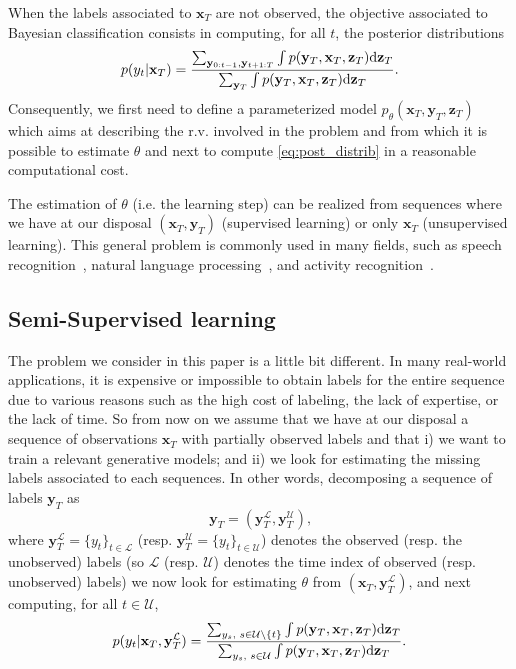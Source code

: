 \documentclass{article}
\def\x{{\mathbf x}}
\def\z{{\mathbf z}}
\def\y{{\mathbf y}}
\def\yl{{\mathbf y}_{T}^{\mathcal{L}}}
\def\yu{{\mathbf y}_{T}^{\mathcal{U}}}
\def\L{{\mathcal L}}
\def\p{p_{\theta}}
\def\L{\mathcal{L}}
\def\U{\mathcal{U}}
\begin{document}
When the labels associated to $\x_T$
are not observed, the objective associated to Bayesian classification consists in computing, for all $t$, the posterior distributions 
\begin{equation}
\label{eq:post_distrib}
p(y_t|\x_T)= %
\frac{\sum_{\y_{0:t-1},\y_{t+1:T}} \int p(\y_T,\x_T,\z_T) {\rm d}\z_T  } {\sum_{\y_T} \int p(\y_T,\x_T,\z_T) {\rm d}\z_T} \text{.}
\end{equation}
Consequently, we 
first need to define a parameterized model $\p(\x_T,\y_T,\z_T)$ which aims
at describing the r.v. involved in the
problem and from which 
it is possible to estimate 
$\theta$ and next to compute \eqref{eq:post_distrib} in a reasonable computational cost. 

The estimation of $\theta$ (i.e. the learning step) can be realized from sequences where we have at our disposal $(\x_T,\y_T)$ (supervised learning) or only $\x_T$ (unsupervised learning).
This general problem is commonly used in many fields, such as speech recognition~\cite{rabiner}, 
natural language processing~\cite{morwal2012named}, and activity recognition~\cite{reyes2016transition}. 





\subsection{Semi-Supervised learning}
The problem we consider in this paper is a little bit different. In many real-world applications, it is expensive or impossible to obtain
labels for the entire sequence due to various reasons such as the high cost of labeling, the lack of expertise, or the lack of time. 
So from now on we assume that
we have at our disposal a sequence of observations
$\x_T$ with partially observed labels
and that i) we want to train a relevant
generative models; and ii) we look for estimating the missing labels associated to each sequences. In other words, decomposing a sequence of labels $\y_T$ as
$$\y_T  = (\yl, \yu) \text{,}$$
where $\yl=\{y_t\}_{t\in \L}$ (resp. $\yu=\{y_t\}_{t\in \U}$) denotes the observed (resp. the unobserved) labels (so $\L$ (resp. $\U$) denotes the time index of observed (resp. unobserved) labels) we now look for estimating
$\theta$ from  $(\x_T,\yl)$, and next
computing, for all $t \in \U$,
$$p(y_t|\x_T,\yl)=\frac{\sum_{y_s \text{, }  s \in \U \backslash \{t\}} \int p(\y_T,\x_T,\z_T) {\rm d}\z_T  } { \sum_{y_s \text{, }  s \in \U} \int p(\y_T,\x_T,\z_T) {\rm d}\z_T} \text{.}$$
\end{document}
